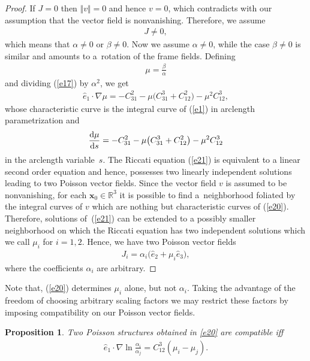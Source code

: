 \documentclass[pdftex]{sigma}
\numberwithin{equation}{section}
\newtheorem{Proposition}[Theorem]{Proposition}
 { \theoremstyle{definition}
\newtheorem{Definition}[Theorem]{Definition} }
\begin{document}
\begin{proof}
If $J=0$ then $\Vert v\Vert =0$ and hence $v=0$, which contradicts with our assumption that the vector f\/ield is nonvanishing. Therefore, we assume
\begin{gather*}
J\neq 0,
\end{gather*}
which means that $\alpha \neq 0$ or $\beta \neq 0$. Now we assume $\alpha \neq 0$, while the case $\beta \neq 0$ is similar and amounts to a~rotation of the frame f\/ields. Def\/ining
\begin{gather*}
\mu =\frac{\beta }{\alpha }
\end{gather*}
and dividing (\ref{e17}) by $\alpha ^{2}$, we get
\begin{gather}
\widehat{e}_{1}\cdot \nabla \mu =-C_{31}^{2}-\mu \big( C_{31}^{3}+C_{12}^{2}\big) -\mu ^{2}C_{12}^{3}, \label{e20}
\end{gather}
whose characteristic curve is the integral curve of (\ref{e1}) in arclength parametrization and
\begin{gather}
\frac{{\rm d}\mu }{{\rm d}s}=-C_{31}^{2}-\mu \big( C_{31}^{3}+C_{12}^{2}\big) -\mu ^{2}C_{12}^{3} \label{e21}
\end{gather}
in the arclength variable~$s$. The Riccati equation (\ref{e21}) is equivalent to a linear second order equation and hence, possesses two linearly independent solutions leading to two Poisson vector f\/ields. Since the vector f\/ield $v$ is assumed to be nonvanishing, for each $\boldsymbol{x}_{0}\in \mathbb{R}^{3}$ it is possible to f\/ind a~neighborhood foliated by the integral curves of $v$ which are nothing but characteristic curves of (\ref{e20}). Therefore, solutions of~(\ref{e21}) can be extended to a possibly smaller neighborhood on which the
Riccati equation has two independent solutions which we call $\mu _{i}$ for $i=1,2$. Hence, we have two Poisson vector f\/ields
\begin{gather}
J_{i}=\alpha _{i} \big( \widehat{e}_{2}+\mu _{i}\widehat{e}_{3} \big), \label{e22}
\end{gather}
where the coef\/f\/icients $\alpha _{i}$ are arbitrary.
\end{proof}

Note that, (\ref{e20}) determines $\mu _{i}$ alone, but not $\alpha _{i}$. Taking the advantage of the freedom of choosing arbitrary scaling factors we may restrict these factors by imposing compatibility on our Poisson vector f\/ields.

\begin{Proposition}\label{proposition2}
Two Poisson structures obtained in \eqref{e20} are compatible iff
\begin{gather}
\widehat{e}_{1}\cdot \nabla \ln \frac{\alpha _{i}}{\alpha _{j}}=C_{12}^{3} ( \mu _{i}-\mu _{j} ). \label{e23}
\end{gather}
\end{Proposition}
\end{document}
